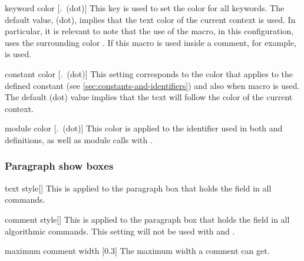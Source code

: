\documentclass[a4paper, 11pt]{article}
\begin{document}
\begin{option}{keyword color}{}
    [.\mbox{\normalfont\normalcolor\normalsize~(dot)}]
    This key is used to set the color for all keywords. The default value,  (dot), implies that the text color of the current context is used. In particular, it is relevant to note that the use of the  macro, in this configuration, uses the surrounding color . If this macro is used inside a comment, for example,  is used.
\end{option}

\begin{option}{constant color}{}
    [.\mbox{\normalfont\normalcolor\normalsize~(dot)}]
    This setting corresponds to the color that applies to the defined constant (see \cref{sec:constants-and-identifiers}) and also when macro  is used. The default  (dot) value implies that the text will follow the color of the current context.
\end{option}

\begin{option}{module color}{}
    [.\mbox{\normalfont\normalcolor\normalsize~(dot)}]
    This color is applied to the identifier used in both  and  definitions, as well as module calls with .
\end{option}

\subsubsection{Paragraph show boxes}

\begin{option}{text style}{}[]
    This  is applied to the paragraph box that holds the  field in all commands.
\end{option}

\begin{option}{comment style}{}[]
    This  is applied to the paragraph box that holds the  field in all algorithmic commands. This setting will not be used with  and .
\end{option}

\begin{option}{maximum comment width}{}
    [0.3]
    The maximum width a comment can get.
\end{option}
\end{document}

